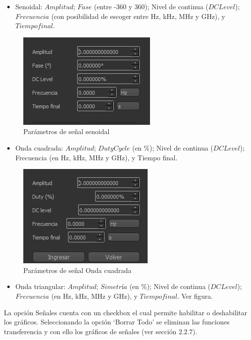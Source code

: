 \begin{itemize}
    \item Senoidal: $Amplitud$; $Fase$ (entre -360 y 360); Nivel de continua ($DC Level$); $Frecuencia$ (con posibilidad de escoger entre Hz, kHz, MHz y GHz), y $Tiempo final$.
\end{itemize}

\begin{figure}[!htb] 
    \centering 
    \includegraphics  [scale=0.8] {../EJ2/LatexScreenshots/senoidal.png} 
    \caption{Parámetros de señal senoidal}
    \label{fig:senoidal}
\end{figure}

\begin{itemize}
    \item Onda cuadrada: $Amplitud$; $Duty Cycle$ (en \%); Nivel de continua ($DC Level$); Frecuencia (en Hz, kHz, MHz y GHz), y Tiempo final.
\end{itemize}

\begin{figure}[!htb] 
    \centering 
    \includegraphics  [scale=0.8]{../EJ2/LatexScreenshots/square.png} 
    \caption{Parámetros de señal Onda cuadrada}
    \label{fig:square}
\end{figure}

\begin{itemize}
    \item Onda triangular: $Amplitud$; $Simetría$ (en \%); Nivel de continua ($DC Level$); $Frecuencia$ (en Hz, kHz, MHz y GHz), y $Tiempo final$. Ver figura.
  \end{itemize}
La opción Señales cuenta con un checkbox el cual permite habilitar o deshabilitar los gráficos. 
Seleccionando la opción ‘Borrar Todo’ se eliminan las funciones transferencia y con ello los gráficos de señales (ver sección $2.2.7$).

